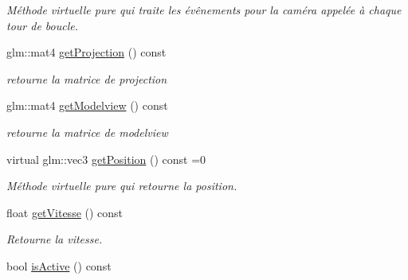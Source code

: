 \begin{DoxyCompactItemize}
\begin{DoxyCompactList}\small\item\em Méthode virtuelle pure qui traite les évênements pour la caméra appelée à chaque tour de boucle. \end{DoxyCompactList}\item 
\hypertarget{classAbstractCamera_a650255e1796dd50a2d95baa8c28fefae}{glm\+::mat4 \hyperlink{classAbstractCamera_a650255e1796dd50a2d95baa8c28fefae}{get\+Projection} () const }\label{classAbstractCamera_a650255e1796dd50a2d95baa8c28fefae}

\begin{DoxyCompactList}\small\item\em retourne la matrice de projection \end{DoxyCompactList}\item 
\hypertarget{classAbstractCamera_a31fa7a470de4ecd2437905ffd57cb40b}{glm\+::mat4 \hyperlink{classAbstractCamera_a31fa7a470de4ecd2437905ffd57cb40b}{get\+Modelview} () const }\label{classAbstractCamera_a31fa7a470de4ecd2437905ffd57cb40b}

\begin{DoxyCompactList}\small\item\em retourne la matrice de modelview \end{DoxyCompactList}\item 
\hypertarget{classAbstractCamera_ae6a61c6c50ffc278ad66f332e19e66a6}{virtual glm\+::vec3 \hyperlink{classAbstractCamera_ae6a61c6c50ffc278ad66f332e19e66a6}{get\+Position} () const =0}\label{classAbstractCamera_ae6a61c6c50ffc278ad66f332e19e66a6}

\begin{DoxyCompactList}\small\item\em Méthode virtuelle pure qui retourne la position. \end{DoxyCompactList}\item 
\hypertarget{classAbstractCamera_a1991c1773cda1eb142c9d127cf6e4107}{float \hyperlink{classAbstractCamera_a1991c1773cda1eb142c9d127cf6e4107}{get\+Vitesse} () const }\label{classAbstractCamera_a1991c1773cda1eb142c9d127cf6e4107}

\begin{DoxyCompactList}\small\item\em Retourne la vitesse. \end{DoxyCompactList}\item 
\hypertarget{classAbstractCamera_a625cd232811561751bd57493e2eadd20}{bool \hyperlink{classAbstractCamera_a625cd232811561751bd57493e2eadd20}{is\+Active} () const }\label{classAbstractCamera_a625cd232811561751bd57493e2eadd20}


\end{DoxyCompactItemize}
